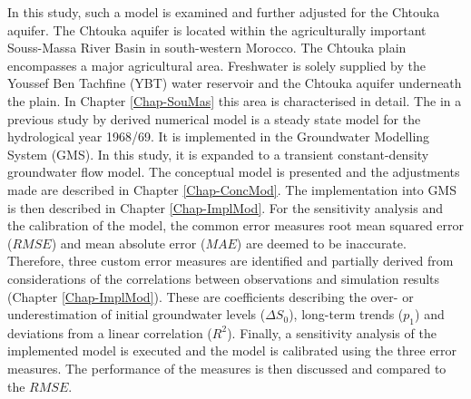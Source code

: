 In this study, such a model is examined and further adjusted for the Chtouka aquifer. 
The Chtouka aquifer is located within the agriculturally important Souss-Massa River Basin in south-western Morocco. 
The Chtouka plain encompasses a major agricultural area. Freshwater is solely supplied by the Youssef Ben Tachfine (YBT) water reservoir and the Chtouka aquifer underneath the plain. 
In Chapter \ref{Chap-SouMas} this area is characterised in detail. 
The in a previous study by \textcite{Horn.2021} derived numerical model is a steady state model for the hydrological year 1968/69. 
It is implemented in the Groundwater Modelling System (GMS). 
In this study, it is expanded to a transient constant-density groundwater flow model. 
The conceptual model is presented and the adjustments made are described in Chapter \ref{Chap-ConcMod}. 
The implementation into GMS is then described in Chapter \ref{Chap-ImplMod}. 
For the sensitivity analysis and the calibration of the model, the common error measures root mean squared error ($RMSE$) and mean absolute error ($MAE$) are deemed to be inaccurate. 
Therefore, three custom error measures are identified and partially derived from considerations of the correlations between observations and simulation results (Chapter \ref{Chap-ImplMod}). 
These are coefficients describing the over- or underestimation of initial groundwater levels ($\Delta S_0$), long-term trends ($p_1$) and deviations from a linear correlation ($R^2$). 
Finally, a sensitivity analysis of the implemented model is executed and the model is calibrated using the three error measures. 
The performance of the measures is then discussed and compared to the $RMSE$.